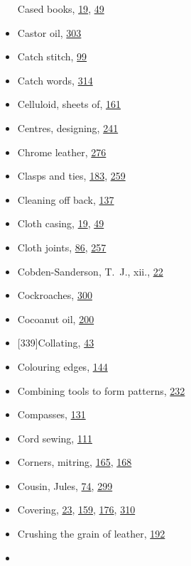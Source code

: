 \documentclass[
]{article}
\begin{document}
\begin{itemize}
  Cased books, \protect\hyperlink{Page_19}{19},
  \protect\hyperlink{Page_49}{49}
\item
  Castor oil, \protect\hyperlink{Page_303}{303}
\item
  Catch stitch, \protect\hyperlink{Page_99}{99}
\item
  Catch words, \protect\hyperlink{Page_314}{314}
\item
  Celluloid, sheets of, \protect\hyperlink{Page_161}{161}
\item
  Centres, designing, \protect\hyperlink{Page_241}{241}
\item
  Chrome leather, \protect\hyperlink{Page_276}{276}
\item
  Clasps and ties, \protect\hyperlink{Page_183}{183},
  \protect\hyperlink{Page_259}{259}
\item
  Cleaning off back, \protect\hyperlink{Page_137}{137}
\item
  Cloth casing, \protect\hyperlink{Page_19}{19},
  \protect\hyperlink{Page_49}{49}
\item
  Cloth joints, \protect\hyperlink{Page_86}{86},
  \protect\hyperlink{Page_257}{257}
\item
  Cobden-Sanderson, T.~J., xii., \protect\hyperlink{Page_22}{22}
\item
  Cockroaches, \protect\hyperlink{Page_300}{300}
\item
  Cocoanut oil, \protect\hyperlink{Page_200}{200}
\item
  {\protect\hypertarget{Page_339}{}{{[}339{]}}}Collating,
  \protect\hyperlink{Page_43}{43}
\item
  Colouring edges, \protect\hyperlink{Page_144}{144}
\item
  Combining tools to form patterns, \protect\hyperlink{Page_232}{232}
\item
  Compasses, \protect\hyperlink{Page_131}{131}
\item
  Cord sewing, \protect\hyperlink{Page_111}{111}
\item
  Corners, mitring, \protect\hyperlink{Page_165}{165},
  \protect\hyperlink{Page_168}{168}
\item
  Cousin, Jules, \protect\hyperlink{Page_74}{74},
  \protect\hyperlink{Page_299}{299}
\item
  Covering, \protect\hyperlink{Page_23}{23},
  \protect\hyperlink{Page_159}{159}, \protect\hyperlink{Page_176}{176},
  \protect\hyperlink{Page_310}{310}
\item
  Crushing the grain of leather, \protect\hyperlink{Page_192}{192}
\item

\end{itemize}
\end{document}
